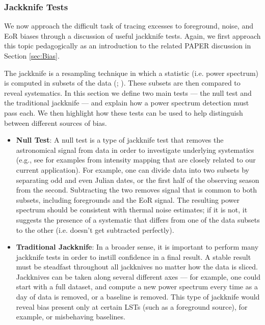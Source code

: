 \documentclass[preprint2,numberedappendix,tighten]{aastex6}  %
\begin{document}
\subsubsection{Jackknife Tests}
\label{sec:JackknifeOverview}

We now approach the difficult task of tracing excesses to foreground, noise, and EoR biases through a discussion of useful 
jackknife tests. Again, we first approach this topic pedagogically as an introduction to the related PAPER discussion in Section 
\ref{sec:Bias}. 

The jackknife is a resampling technique in which a statistic (i.e. power spectrum) is computed in subsets of the data (\citealt{quenouille1949}; \citealt{tukey1958}). These 
subsets are then compared to reveal systematics. In this section we define two main tests --- the null test and the traditional 
jackknife --- and explain how a power spectrum detection must pass each. We then highlight how these tests can be used to 
help distinguish between different sources of bias.
 
\begin{itemize}
\item \textbf{Null Test}: A null test is a type of jackknife test that removes the astronomical signal from data in order to 
investigate underlying systematics (e.g., see \citet{keating_et_al2016} for examples from intensity mapping that are closely related to our current application). For example, one can 
divide data into two subsets by separating odd and even Julian dates, or the first half of the observing season from the second. 
Subtracting the two removes signal that is common to both subsets, including foregrounds and the EoR signal. The resulting power 
spectrum should be consistent with thermal noise estimates; if it is not, it suggests the presence of a systematic that differs 
from one of the data subsets to the other (i.e. doesn't get subtracted perfectly). 
\item \textbf{Traditional Jackknife}: In a broader sense, it is important to perform many jackknife tests in order to instill 
confidence in a final result. A stable result must be steadfast throughout all jackknives no matter how the data is sliced. 
Jackknives can be taken along several different axes --- for example, one could start with a full dataset, and compute a new 
power spectrum every time as a day of data is removed, or a baseline is removed. This type of jackknife would reveal bias 
present only at certain LSTs (such as a foreground source), for example, or misbehaving baselines.
\end{itemize}
\end{document}
